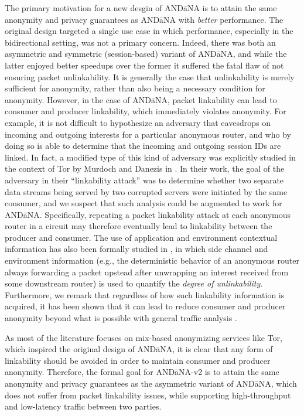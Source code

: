 The primary motivation for a new desgin of {\sf AND\=aNA} is to attain the same anonymity and privacy guarantees as {\sf AND\=aNA} with \emph{better} performance. The original design targeted a single use case in which performance, especially in the bidirectional setting, was not a primary concern. Indeed, there was both an asymmetric and symmetric (session-based) variant of {\sf AND\=aNA}, and while the latter enjoyed better speedups over the former it suffered the fatal flaw of not ensuring packet unlinkability. It is generally the case that unlinkability is merely sufficient for anonymity, rather than also being a necessary condition for anonymity. However, in the case of {\sf AND\=aNA}, packet linkability can lead to consumer and producer linkability, which immediately violates anonymity. For example, it is not difficult to hypothesize an adversary that eavesdrops on incoming and outgoing interests for a particular anonymous router, and who by doing so is able to determine that the incoming and outgoing session IDs are linked. In fact, a modified type of this kind of adversary was explicitly studied in the context of Tor by Murdoch and Danezis in \cite{tor-traffic-analysis}. In their work, the goal of the adversary in their ``linkability attack'' was to determine whether two separate data streams being served by two corrupted servers were initiated by the same consumer, and we suspect that such analysis could be augmented to work for {\sf AND\=aNA}. Specifically, repeating a packet linkability attack at each anonymous router in a circuit may therefore eventually lead to linkability between the producer and consumer. The use of application and environment contextual information has also been formally studied in \cite{attacking-unlinkability}, in which side channel and environment information (e.g., the deterministic behavior of an anonymous router always forwarding a packet upstead after unwrapping an interest received from some downstream router) is used to quantify the \emph{degree of unlinkability}. Furthermore, we remark that regardless of how such linkability information is acquired, it has been shown that it can lead to reduce consumer and producer anonymity beyond what is possible with general traffic analysis \cite{linkability-attacks}. 

As most of the literature focuses on mix-based anonymizing services like Tor, which inspired the original design of {\sf AND\=aNA}, it is clear that any form of linkability should be avoided in order to maintain consumer and producer anonymity. Therefore, the formal goal for {\sf AND\=aNA-v2} is to attain the same anonymity and privacy guarantees as the asymmetric variant of {\sf AND\=aNA}, which does not suffer from packet linkability issues, while supporting high-throughput and low-latency traffic between two parties. 

